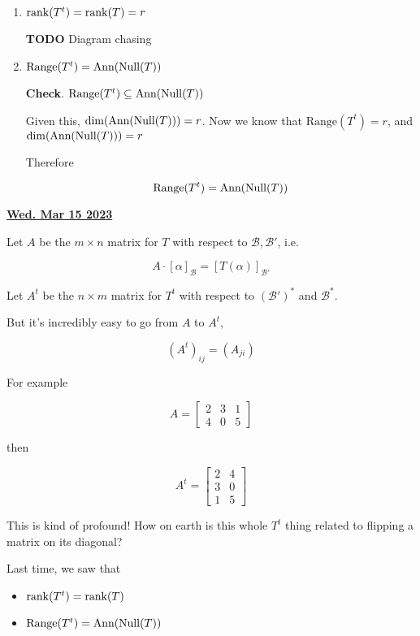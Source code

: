 \documentclass[12pt]{article}
\renewcommand{\date}[1]{\underline{\bf #1}}
\def\range{\text{Range}}
\def\Ann{\text{Ann}}
\def\B{\mathcal B}
\newcommand{\TODO}{\color{red}\textbf{TODO}\color{black}}
\begin{document}
{\begin{enumerate}
        So what we have is that, if $g$ is in the Null Space of $T^t$, it also
        must be in the Annihilator of the Range of $T$.

      \item $\mathrm{rank}(T^t) = \mathrm{rank}(T) = r$ 

        \TODO{} Diagram chasing

      \item $\range(T^t) = \Ann(\Null(T))$

        {\bf Check}. $\range(T^t) \subseteq \Ann(\Null(T))$

        Given this, $\dim(\Ann(\Null(T))) = r$. Now we know that $\range(T^t) =
        r$, and $\dim(\Ann(\Null(T))) = r$

        Therefore

        \[
          \range(T^t) = \Ann(\Null(T))
        \]
    \end{enumerate}
  }

  \date{Wed. Mar 15 2023}

  Let $A$ be the $m \times n$ matrix for $T$ with respect to $\B, \B'$, i.e.

  \[
    A \cdot [\alpha]_{\B} = [T(\alpha)]_{\B'}
  \]

  Let $A^t$ be the $n \times m$ matrix for $T^t$ with respect to
  $\left(\B'\right)^*$ and $\B^*$.

  But it's incredibly easy to go from $A$ to $A^t$,

  \[
    \left(A^t\right)_{ij} = \left(A_{ji}\right)
  \]

  For example

  \[
    A = \begin{bmatrix}
      2 & 3 & 1 \\
      4 & 0 & 5
    \end{bmatrix}
  \]

  then

  \[
    A^t = \begin{bmatrix}
      2 & 4 \\
      3 & 0 \\
      1 & 5
    \end{bmatrix}
  \]

  This is kind of profound! How on earth is this whole $T^t$ thing related to
  flipping a matrix on its diagonal?


  Last time, we saw that

  \begin{itemize}
    \item $\mathrm{rank}(T^t) = \mathrm{rank}(T)$
    \item $\range(T^t) = \Ann(\Null(T))$
  \end{itemize}
\end{document}
